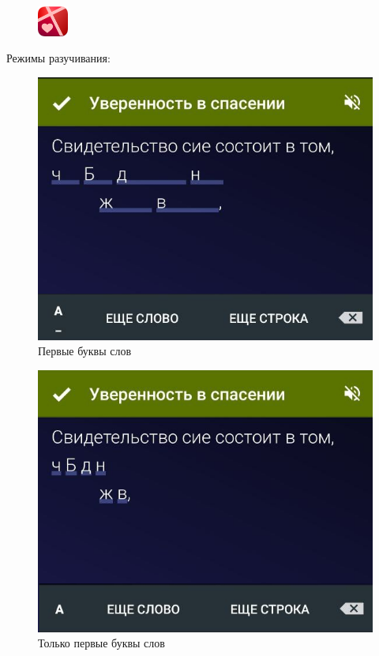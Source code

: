 \documentclass[t,aspectratio=169,14pt]{beamer}  %
\begin{document}
\begin{frame}[c]
	\frametitle{\insertsection}
	\begin{figure}
		\begin{flushright}
		\vspace{-1.5cm}
		\includegraphics[width=1cm]{remember-me-logo}
	\end{flushright}
		\end{figure}

	Режимы разучивания:
	 \begin{multicols}{2}
		\begin{center}
			\begin{figure}
				\includegraphics[height=0.55\textheight]{remember-me-card-hide-letters-underscores}
				\caption{Первые буквы слов}
				\end{figure}		
			\end{center}			
			\begin{figure}
			\includegraphics[height=0.55\textheight]{remember-me-card-hide-letter}
			\caption{Только первые буквы слов}
			\end{figure}


\end{multicols}
\end{frame}
\end{document}
